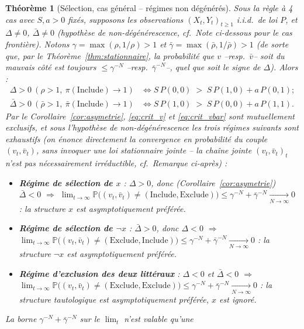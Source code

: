 \documentclass[12pt,a4paper]{article}
\newtheorem{theorem}{Théorème}[section]
\theoremstyle{remark}
\newcommand{\Inc}{\ensuremath{\mathrm{Include}}}
\newcommand{\Exc}{\ensuremath{\mathrm{Exclude}}}
\newcommand{\vbar}{\bar{v}}
\begin{document}
\begin{theorem}[Sélection, cas général -- régimes non dégénérés]\label{thm:selection}
Sous la règle à 4 cas avec $S,a>0$ fixés, supposons les observations
$(X_t,Y_t)_{t\ge1}$ i.i.d.\ de loi $P$, et $\Delta\ne0$, $\bar\Delta\ne0$
(hypothèse de non-dégénérescence, cf.\ Note ci-dessous pour le cas frontière).
Notons $\gamma=\max(\rho,1/\rho)>1$ et $\bar\gamma=\max(\bar\rho,1/\bar\rho)>1$
(de sorte que, par le Théorème~\ref{thm:stationnaire}, la probabilité que $v$
--resp.\ $\vbar$-- soit du mauvais côté est toujours $\le\gamma^{-N}$ --resp.\
$\bar\gamma^{-N}$--, quel que soit le signe de $\Delta$). Alors :
\begin{align}
  \Delta>0\ (\rho>1,\ \pi(\Inc)\to1) &\iff S\,P(0,0) \;>\; S\,P(1,0)+a\,P(0,1); \label{eq:crit_v}\\
  \bar\Delta>0\ (\bar\rho>1,\ \bar\pi(\Inc)\to1) &\iff S\,P(1,0) \;>\; S\,P(0,0)+a\,P(1,1). \label{eq:crit_vbar}
\end{align}
Par le Corollaire~\ref{cor:asymetrie}, \eqref{eq:crit_v} et \eqref{eq:crit_vbar}
sont mutuellement exclusifs, et sous l'hypothèse de non-dégénérescence les
trois régimes suivants sont exhaustifs (on énonce directement la convergence
en probabilité du couple $(v_t,\vbar_t)$, \emph{sans} invoquer une loi
stationnaire jointe -- la chaîne jointe $(v_t,\vbar_t)_t$ n'est pas
nécessairement irréductible, cf.\ Remarque ci-après) :
\begin{itemize}
  \item \textbf{Régime de sélection de $x$} : $\Delta>0$, donc
  (Corollaire~\ref{cor:asymetrie}) $\bar\Delta<0$ $\Rightarrow$
  $\lim_{t\to\infty}\mathbb P\bigl((v_t,\vbar_t)\ne(\Inc,\Exc)\bigr)
  \le\gamma^{-N}+\bar\gamma^{-N}\xrightarrow[N\to\infty]{}0$ :
  la structure $x$ est asymptotiquement préférée.
  \item \textbf{Régime de sélection de $\neg x$} : $\bar\Delta>0$, donc $\Delta<0$
  $\Rightarrow$
  $\lim_{t\to\infty}\mathbb P\bigl((v_t,\vbar_t)\ne(\Exc,\Inc)\bigr)
  \le\gamma^{-N}+\bar\gamma^{-N}\xrightarrow[N\to\infty]{}0$ :
  la structure $\neg x$ est asymptotiquement préférée.
  \item \textbf{Régime d'exclusion des deux littéraux} : $\Delta<0$ \emph{et}
  $\bar\Delta<0$ $\Rightarrow$
  $\lim_{t\to\infty}\mathbb P\bigl((v_t,\vbar_t)\ne(\Exc,\Exc)\bigr)
  \le\gamma^{-N}+\bar\gamma^{-N}\xrightarrow[N\to\infty]{}0$ :
  la structure tautologique est asymptotiquement préférée, $x$ est ignoré.
\end{itemize}
La borne $\gamma^{-N}+\bar\gamma^{-N}$ sur le $\lim_t$ n'est valable qu'une

\end{theorem}
\end{document}
